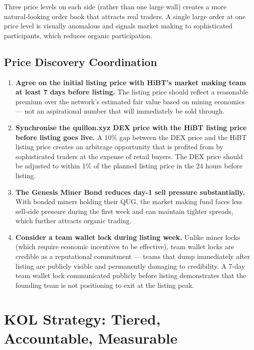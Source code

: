 \documentclass[11pt,a4paper]{article}
\begin{document}
Three price levels on each side (rather than one large wall) creates a more natural-looking order book that attracts real traders. A single large order at one price level is visually anomalous and signals market making to sophisticated participants, which reduces organic participation.

\subsection{Price Discovery Coordination}

\begin{enumerate}[leftmargin=1.5em]
  \item \textbf{Agree on the initial listing price with HiBT's market making team at least 7 days before listing.} The listing price should reflect a reasonable premium over the network's estimated fair value based on mining economics — not an aspirational number that will immediately be sold through.

  \item \textbf{Synchronise the quillon.xyz DEX price with the HiBT listing price before listing goes live.} A 10\% gap between the DEX price and the HiBT listing price creates an arbitrage opportunity that is profited from by sophisticated traders at the expense of retail buyers. The DEX price should be adjusted to within 1\% of the planned listing price in the 24 hours before listing.

  \item \textbf{The Genesis Miner Bond reduces day-1 sell pressure substantially.} With bonded miners holding their QUG, the market making fund faces less sell-side pressure during the first week and can maintain tighter spreads, which further attracts organic trading.

  \item \textbf{Consider a team wallet lock during listing week.} Unlike miner locks (which require economic incentives to be effective), team wallet locks are credible as a reputational commitment — teams that dump immediately after listing are publicly visible and permanently damaging to credibility. A 7-day team wallet lock communicated publicly before listing demonstrates that the founding team is not positioning to exit at the listing peak.
\end{enumerate}

\section{KOL Strategy: Tiered, Accountable, Measurable}
\label{sec:kol}
\end{document}
